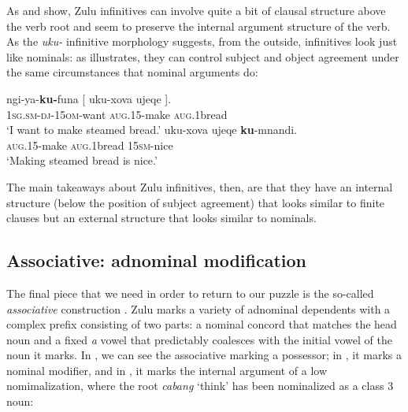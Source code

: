 \documentclass[output=paper,colorlinks,citecolor=brown]{langscibook}
\begin{document}
As  and  show, Zulu infinitives can involve quite a bit of clausal structure above the verb root and seem to preserve the internal argument structure of the verb. As the \textit{uku-} infinitive morphology suggests, from the outside, infinitives look just like nominals: as  illustrates, they can control subject and object agreement under the same circumstances that nominal arguments do:


\ea%
    \label{ex:halpert:9}
    \ea%
    \label{ex:halpert:9a}
    \gll    ngi-ya-\textbf{ku-}funa [ uku-xova ujeqe ].\\
            1\textsc{sg}.\textsc{sm}-\textsc{dj}-15\textsc{om}-want {} \textsc{aug}.15-make \textsc{aug}.1bread\\
    \glt    `I want to make steamed bread.'
    \ex%
    \label{ex:halpert:9b}
    \gll    uku-xova ujeqe \textbf{ku}-mnandi.\\
            \textsc{aug}.15-make \textsc{aug}.1bread 15\textsc{sm}-nice\\
    \glt    `Making steamed bread is nice.'
    \z 
\z 

The main takeaways about Zulu infinitives, then, are that they have an internal structure (below the position of subject agreement) that looks similar to finite clauses but an external structure that looks similar to nominals.

\subsection{Associative: adnominal modification}\label{sec:halpert:2.3}

The final piece that we need in order to return to our puzzle is the so-called \textit{associative} construction \citep{Sabelo1990,Halpert2015,Jones2018}. Zulu marks a variety of adnominal dependents with a complex prefix consisting of two parts: a nominal concord that matches the head noun and a fixed \textit{a} vowel that predictably coalesces with the initial vowel of the noun it marks.  In , we can see the associative marking a possessor; in , it marks a nominal modifier, and in , it marks the internal argument of a low nomimalization, where the root \textit{cabang} `think' has been nominalized as a class 3 noun:
\end{document}
